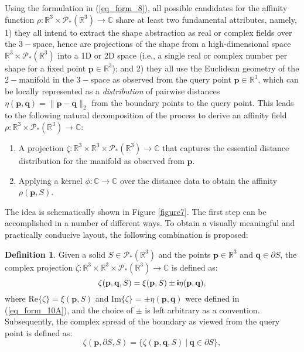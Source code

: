 \documentclass[article]{gmp2014}
\theoremstyle{definition}
\newtheorem{defn}{\textsf{\textbf{{Definition}}}}
\newcommand{\ii}{\text{\textsf{\textbf{i}}}}
\begin{document}
Using the formulation in (\ref{eq_form_8}), all possible candidates for the affinity function $\rho: \mathds{R}^3 \times \mathcal{P}_\ast(\mathds{R}^3) \rightarrow \mathds{C}$ share at least two fundamental attributes, namely, 1) they all intend to extract the shape abstraction as real or complex fields over the $3-$space, hence are projections of the shape from a high-dimensional space $\mathds{R}^3 \times \mathcal{P}_\ast(\mathds{R}^3)$ into a 1D or 2D space (i.e., a single real or complex number per shape for a fixed point $\mathbf{p} \in \mathds{R}^3$); and 2) they all use the Euclidean geometry of the $2-$manifold in the $3-$space as observed from the query point $\mathbf{p} \in \mathds{R}^3$, which can be locally represented as a {\it distribution} of pairwise distances $\eta(\mathbf{p}, \mathbf{q}) = \| \mathbf{p} - \mathbf{q} \|_2$ from the boundary points to the query point. This leads to the following natural decomposition of the process to derive an affinity field $\rho: \mathds{R}^3 \times \mathcal{P}_\ast(\mathds{R}^3) \rightarrow \mathds{C}$:
%
\begin{enumerate}
    \item A projection $\zeta: \mathds{R}^3 \times \mathds{R}^3 \times \mathcal{P}_\ast(\mathds{R}^3) \rightarrow \mathds{C}$ that captures the essential distance distribution for the manifold as observed from $\mathbf{p}$.
    \item Applying a kernel $\phi: \mathds{C} \rightarrow \mathds{C}$ over the distance data to obtain the affinity $\rho(\mathbf{p}, S)$.
\end{enumerate}
%
The idea is schematically shown in Figure \ref{figure7}. The first step can be accomplished in a number of different ways. To obtain a visually meaningful and practically conducive layout, the following combination is proposed:

%
\begin{defn}
    Given a solid $S \in \mathcal{P}_\ast(\mathds{R}^3)$ and the points $\mathbf{p} \in \mathds{R}^3$ and $\mathbf{q} \in \partial S$, the complex projection $\zeta: \mathds{R}^3 \times \mathds{R}^3 \times \mathcal{P}_\ast(\mathds{R}^3) \rightarrow \mathds{C}$ is defined as:
    \begin{equation}
        \zeta(\mathbf{p}, \mathbf{q}, S) = \xi(\mathbf{p}, S) \pm \ii \eta(\mathbf{p}, \mathbf{q}), \label{eq_form_11}
    \end{equation}
    where $\mathrm{Re}\{\zeta\} = \xi(\mathbf{p}, S)$ and $\mathrm{Im}\{\zeta\} = \pm \eta(\mathbf{p}, \mathbf{q})$ were defined in {\rm (\ref{eq_form_10A})}, and the choice of $\pm$ is left arbitrary as a convention. Subsequently, the complex spread of the boundary as viewed from the query point is defined as:
    \begin{equation}
        \zeta(\mathbf{p}, \partial S, S) = \big\{ \zeta(\mathbf{p}, \mathbf{q}, S) ~|~ \mathbf{q} \in \partial S \big\}, \label{eq_form_12}
    \end{equation}
\end{defn}
%
\end{document}
